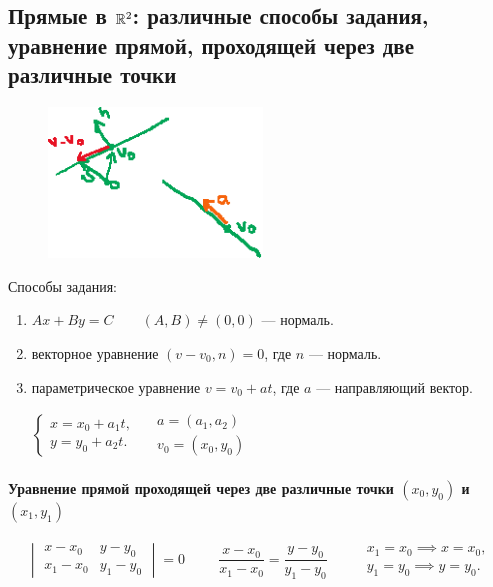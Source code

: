\subsection{Прямые в $\mathbb{R}^2$: различные способы задания, уравнение прямой, проходящей через две различные точки}

\begin{figure}
    \includegraphics[height=4cm]{lecture26_drawing_1}
    \vspace{-110pt}
\end{figure}

Способы задания:
\begin{enumerate}
    \item $Ax + By = C \quad\quad (A, B) \neq (0, 0)$ --- нормаль.
    \item векторное уравнение $(v - v_0, n) = 0$, где $n$ --- нормаль.
    \item параметрическое уравнение $v = v_0 + at$, где $a$ --- направляющий вектор.

        \begin{math}
            \begin{cases}
                x = x_0 + a_1 t, \\
                y = y_0 + a_2 t.
            \end{cases} \quad
            \begin{gathered}
                a = (a_1, a_2) \\
                v_0 = (x_0, y_0)
            \end{gathered}
        \end{math}
\end{enumerate}

\paragraph{Уравнение прямой проходящей через две различные точки $(x_0, y_0)$ и $(x_1, y_1)$}

\begin{equation*}
    \begin{vmatrix} 
        x - x_0 & y - y_0 \\
        x_1 - x_0 & y_1 - y_0
    \end{vmatrix} = 0 \hspace{1cm}
    \frac{x - x_0}{x_1 - x_0} = \frac{y - y_0}{y_1 - y_0} \hspace{1cm}
    \begin{gathered}
        x_1 = x_0 \implies x = x_0, \\
        y_1 = y_0 \implies y = y_0.
    \end{gathered}
\end{equation*}


